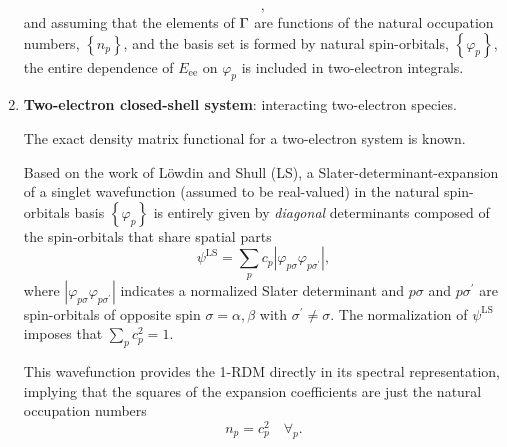\begin{enumerate}
\begin{equation}
            ,
        \end{equation}
        and assuming that the elements of $\Gamma$ are functions of the natural 
        occupation numbers, $\left\{ n_p \right\}$, and the basis set is formed by 
        natural spin-orbitals, $\left\{ \varphi_p \right\}$, the entire dependence of
        $E_{\text{ee}}$ on $\varphi_p$ is included in two-electron integrals.

    \item \textbf{Two-electron closed-shell system}: interacting two-electron
        species.

        The exact density matrix functional for a two-electron system is
        known.

        Based on the work of Löwdin and Shull (LS),
        a Slater-determinant-expansion of a singlet wavefunction (assumed to be
        real-valued) in the natural spin-orbitals basis $\left\{ \varphi_p \right\}$ 
        is entirely given by \textit{diagonal} determinants composed of the
        spin-orbitals that share spatial parts 
        \begin{equation}
            \psi^{\text{LS}} =
            \sum_{p} c_p \left| \varphi_{p \sigma} \varphi_{p \sigma^{\prime}} \right|
            ,
        \end{equation}
        where $\left| \varphi_{p \sigma} \varphi_{p \sigma^{\prime}} \right|$
        indicates a 
        normalized Slater determinant and $p \sigma$ and $p \sigma^{\prime}$ are
        spin-orbitals of opposite spin $\sigma = \alpha, \beta$ with 
        $\sigma^{\prime} \not= \sigma$.
        The normalization of $\psi^{\text{LS}}$ imposes
        that $\displaystyle\sum_{p} c_p^{2} = 1$.

        This wavefunction provides the 1-RDM directly in its spectral 
        representation, implying that the squares of the expansion 
        coefficients are just the natural occupation numbers
        \begin{equation}
            n_p = c_p^2\quad \forall_p
            .
        \end{equation}


\end{enumerate}
